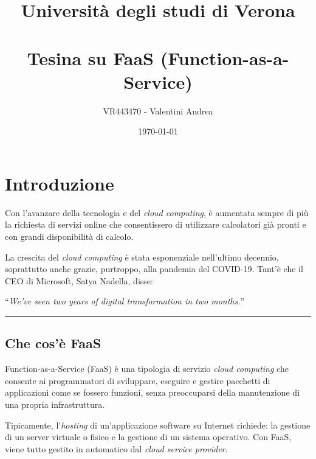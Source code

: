 \documentclass[a4paper]{article}
\newcommand{\longline}{\noindent\rule{\textwidth}{0.4pt}}
\newcommand{\dquotes}[1]{``#1''}
\begin{document}
	\author{VR443470 - Valentini Andrea}
	\title{Università degli studi di Verona \\
		\:\\
		Tesina su FaaS (Function-as-a-Service)}
	\date{\printdayoff\today}
	\maketitle
	
	\newpage
	
	\tableofcontents
	
	\newpage
	
	\section{Introduzione}
	
	Con l'avanzare della tecnologia e del \emph{cloud computing}, è aumentata sempre di più la richiesta di servizi online che consentissero di utilizzare calcolatori già pronti e con grandi disponibilità di calcolo.
	
	La crescita del \emph{cloud computing} è stata esponenziale nell'ultimo decennio, soprattutto anche grazie, purtroppo, alla pandemia del COVID-19. Tant'è che il CEO di Microsoft, Satya Nadella, disse:
	\begin{center}
		\dquotes{\emph{We’ve seen two years of digital transformation in two months.}}
	\end{center}
	
	\longline
	
	\subsection{Che cos'è FaaS}
	
	Function-as-a-Service (FaaS) è una tipologia di servizio \emph{cloud computing} che consente ai programmatori di sviluppare, eseguire e gestire pacchetti di applicazioni come se fossero funzioni, senza preoccuparsi della manutenzione di una propria infrastruttura.
	
	Tipicamente, l'\emph{hosting} di un'applicazione software su Internet richiede: la gestione di un server virtuale o fisico e la gestione di un sistema operativo. Con FaaS, viene tutto gestito in automatico dal \emph{cloud service provider}.
	
\end{document}
